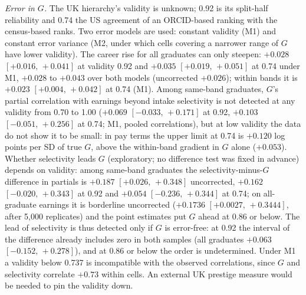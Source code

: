 \documentclass[11pt]{article}
\newcommand{\ci}[2]{$[#1,\allowbreak\,#2]$}
\begin{document}
\emph{Error in $G$.} The UK hierarchy's validity is unknown; 0.92 is its split-half reliability and 0.74 the US
agreement of an ORCID-based ranking with the census-based ranks. Two error models are used: constant validity (M1)
and constant error variance (M2, under which cells covering a narrower range of $G$ have lower validity). The career
rise for all graduates can only steepen: $+0.028$ \ci{+0.016}{+0.041} at validity 0.92 and $+0.035$
\ci{+0.019}{+0.051} at 0.74 under M1, $+0.028$ to $+0.043$ over both models (uncorrected $+0.026$); within bands it is
$+0.023$ \ci{+0.004}{+0.042} at 0.74 (M1). Among same-band graduates, $G$'s partial correlation with earnings beyond
intake selectivity is not detected at any validity from 0.70 to 1.00 ($+0.069$ \ci{-0.033}{+0.171} at 0.92, $+0.103$
\ci{-0.051}{+0.256} at 0.74; M1, pooled correlations), but at low validity the data do not show it to be small: in pay
terms the upper limit at 0.74 is $+0.120$ log points per SD of true $G$, above the within-band gradient in $G$ alone
($+0.053$). Whether selectivity leads $G$ (exploratory; no difference test was fixed in advance) depends on validity:
among same-band graduates the selectivity-minus-$G$ difference in partials is $+0.187$ \ci{+0.026}{+0.348}
uncorrected, $+0.162$ \ci{-0.020}{+0.343} at 0.92 and $+0.054$ \ci{-0.236}{+0.344} at 0.74; on all-graduate
earnings it is borderline uncorrected ($+0.1736$ \ci{+0.0027}{+0.3444}, after 5,000 replicates) and the point
estimates put $G$ ahead at 0.86 or below. The lead of selectivity is thus detected only if $G$ is error-free: at
0.92 the interval of the difference already includes zero in both samples (all graduates $+0.063$
\ci{-0.152}{+0.278}), and at 0.86 or below the order is undetermined. Under M1 a
validity below 0.737 is incompatible with the observed correlations, since $G$ and selectivity correlate $+0.73$
within cells. An external UK prestige measure would be needed to pin the validity down.
\end{document}
